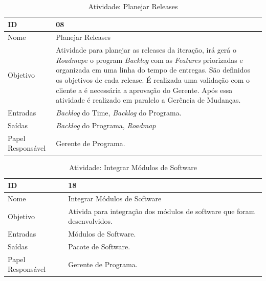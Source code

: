   \begin{table}[H]
    \centering
      \begin{tabular}{| m{5em} | m{10cm} |}
        \hline
        ID       & 08   \\ \hline
        Nome     & Planejar Releases  \\ \hline
        Objetivo & Atividade para planejar as releases da iteração, irá gerá o \textit{Roadmap}e o program \textit{Backlog} com as \textit{Features}  priorizadas e organizada em uma linha do tempo de entregas. São definidos os objetivos de cada release. É realizada uma validação com o cliente a é necessária a aprovação do Gerente. Após essa atividade é realizado em paralelo a Gerência de Mudanças. \\ \hline
        Entradas & \textit{Backlog} do Time, \textit{Backlog} do Programa. \\ \hline
        Saídas   & \textit{Backlog} do Programa, \textit{Roadmap}\\ \hline
        Papel Responsável   & Gerente de Programa. \\ \hline
      \end{tabular}
      \caption{Atividade: Planejar Releases}
      \label{tabela:atividade8}
  \end{table}

  \begin{table}[H]
    \centering
      \begin{tabular}{| m{5em} | m{10cm} |}
        \hline
        ID       & 18   \\ \hline
        Nome     & Integrar Módulos de Software  \\ \hline
        Objetivo & Ativida para integração dos módulos de software que foram desenvolvidos. \\ \hline
        Entradas & Módulos de Software. \\ \hline
        Saídas   & Pacote de Software. \\ \hline
        Papel Responsável   & Gerente de Programa. \\ \hline
      \end{tabular}
      \caption{Atividade: Integrar Módulos de Software}
      \label{tabela:atividade18}
  \end{table}

